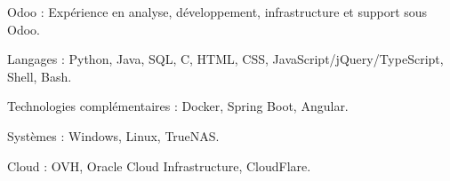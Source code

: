 \begin{indentsection}{\parindent}
  \begin{description*}
    \item[Odoo :] Expérience en analyse, développement, infrastructure et support sous Odoo.
    \item[Langages :] Python, Java, SQL, C, HTML, CSS, JavaScript/jQuery/TypeScript, Shell, Bash.
    \item[Technologies complémentaires :] Docker, Spring Boot, Angular.
    \item[Systèmes :] Windows, Linux, TrueNAS.
    \item[Cloud :] OVH, Oracle Cloud Infrastructure, CloudFlare.

  \end{description*}
\end{indentsection}
